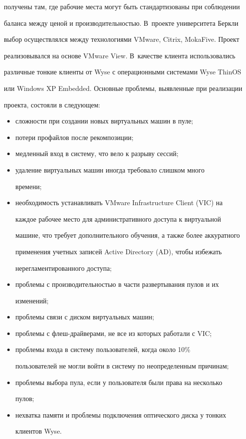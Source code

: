 получены там, где рабочие места могут быть стандартизованы при соблюдении 

баланса между ценой и производительностью. В~проекте университета Беркли 

выбор осуществлялся между технологиями VMware, Citrix, MokaFive. Проект 

реализовывался на основе VMware View. В~качестве клиента использовались 

различные тонкие клиенты от Wyse с операционными системами Wyse ThinOS 

или Windows XP Embedded. Основные проблемы, выявленные при реализации 

проекта, состояли в следующем: 

  \begin{itemize}

\item сложности при создании новых виртуальных машин в пуле;

\item потери профайлов после рекомпозиции; 

\item медленный вход в систему, что вело к разрыву сессий; 

\item удаление виртуальных машин иногда требовало слишком много 

времени; 

\item необходимость устанавливать VMware Infrastructure Client (VIC) на 

каждое рабочее место для административного доступа к виртуальной 

машине, что требует дополнительного обучения, а также более аккуратного 

применения учетных записей Active Directory (AD), чтобы избежать 

нерегламентированного доступа; 

\item проблемы с производительностью в части развертывания пулов и их 

изменений;

\item проблемы связи с диском виртуальных машин;

\item проблемы с флеш-драй\-ве\-ра\-ми, не все из которых работали с VIC;

\item проблемы входа в систему пользователей, когда около 10\% 

пользователей не могли войти в систему по неопределенным причинам;

\item проблемы выбора пула, если у пользователя были права на несколько 

пулов;

\item нехватка памяти и проблемы подключения оптического диска у тонких 

клиентов Wyse. 

\end{itemize}



